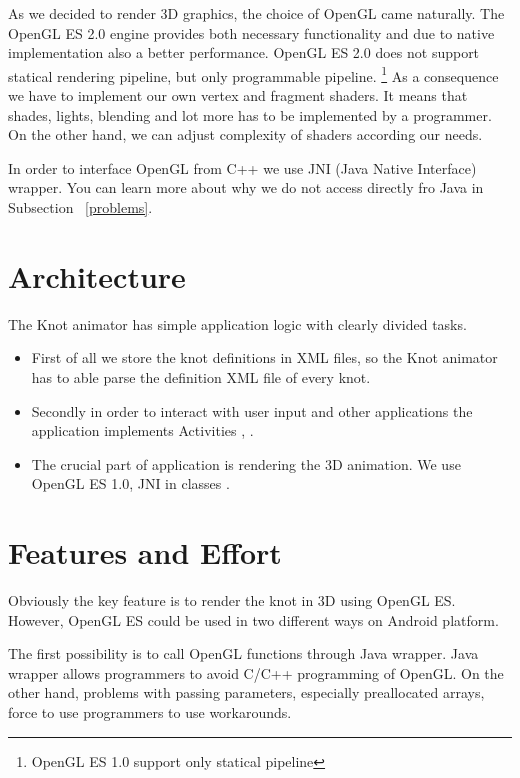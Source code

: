 As we decided to render 3D graphics, the choice of OpenGL came naturally.
The OpenGL ES 2.0 engine provides both necessary functionality and due to
native implementation also a better performance.
OpenGL ES 2.0 does not support statical rendering pipeline, 
but only programmable pipeline. \footnote{OpenGL ES 1.0 support only statical pipeline}
As a consequence we have to implement our own vertex and fragment shaders.
It means that shades, lights, blending and lot more has to be implemented by a programmer.
On the other hand, we can adjust complexity of shaders according our needs.

In order to interface OpenGL from C++ we use JNI (Java Native Interface) wrapper.
You can learn more about why we do not access directly fro Java in Subsection ~\ref{problems}.


\section*{Architecture} %
\label{sec:Architecture}
The Knot animator has simple application logic with clearly divided tasks.
\begin{itemize}
  \item First of all we store the knot definitions in XML files,
so the Knot animator has to able parse the definition XML file of every knot.
  \item Secondly in order to interact with user input and other applications the application 
  implements Activities , .
  \item The crucial part of application is rendering the 3D animation. We use OpenGL ES 1.0,
      JNI in classes  .
\end{itemize}



\section*{Features and Effort} %
\label{sec:Features and Effort}
Obviously the key feature is to render the knot in 3D using OpenGL ES.
However, OpenGL ES could be used in two different ways on Android platform.

The first possibility is to call OpenGL functions through Java wrapper.
Java wrapper allows programmers to avoid C/C++ programming of OpenGL.
On the other hand, problems with passing parameters, especially preallocated arrays,
force to use programmers to use workarounds.

